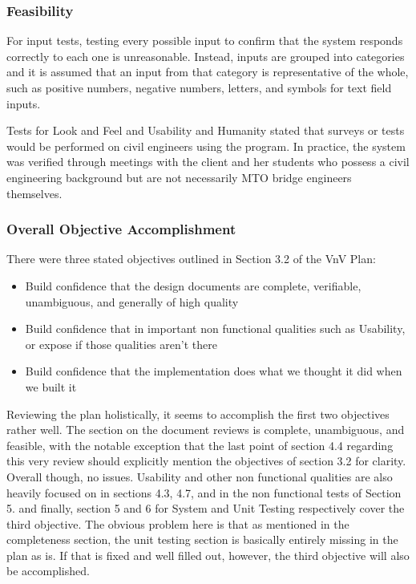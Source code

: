 \documentclass[12pt, titlepage]{article}
\begin{document}
\subsubsection{Feasibility}

For input tests, testing every possible input to confirm that the system responds correctly to each one is unreasonable. Instead, inputs are grouped into categories and it is assumed that an input from that category is representative of the whole, such as positive numbers, negative numbers, letters, and symbols for text field inputs.

Tests for Look and Feel and Usability and Humanity stated that surveys or tests would be performed on civil engineers using the program. In practice, the system was verified through meetings with the client and her students who possess a civil engineering background but are not necessarily MTO bridge engineers themselves.

\subsubsection{Overall Objective Accomplishment}
There were three stated objectives outlined in Section 3.2 of the VnV Plan:\\
\begin{itemize}
\item Build confidence that the design documents are complete, verifiable, unambiguous, and generally of high quality\\
\item Build confidence that in important non functional qualities such as Usability, or expose if those qualities aren't there\\
\item Build confidence that the implementation does what we thought it did when we built it\\
\end{itemize}
Reviewing the plan holistically, it seems to accomplish the first two objectives rather well. The section on the document reviews is complete, unambiguous, and feasible,
with the notable exception that the last point of section 4.4 regarding this very review should explicitly mention the objectives of section 3.2 for clarity. Overall though,
no issues. Usability and other non functional qualities are also heavily focused on in sections 4.3, 4.7, and in the non functional tests of Section 5. and finally, section 5
and 6 for System and Unit Testing respectively cover the third objective. The obvious problem here is that as mentioned in the completeness section, the unit testing section
is basically entirely missing in the plan as is. If that is fixed and well filled out, however, the third objective will also be accomplished.\\
\end{document}
